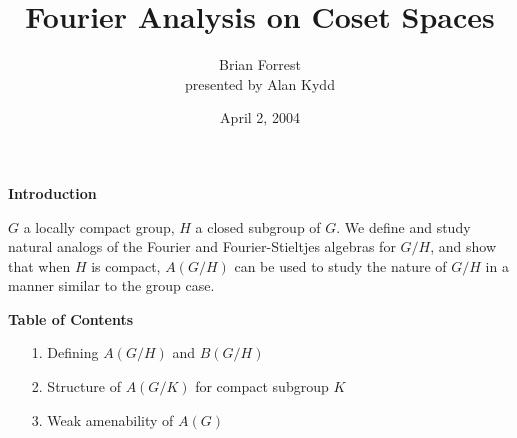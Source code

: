 \documentclass[landscape]{slides}
\title{Fourier Analysis on Coset Spaces}
\author{Brian Forrest\\presented by Alan Kydd}
\date{April 2, 2004}
\begin{document}
\maketitle

\begin{slide}
\textbf{Introduction}

$G$ a locally compact group, $H$ a closed subgroup of $G$.  We define and study
natural analogs of the Fourier and Fourier-Stieltjes algebras for $G/H$, and show
that when $H$ is compact, $A(G/H)$ can be used to study the nature of $G/H$ in a manner
similar to the group case.

\textbf{Table of Contents}
\begin{enumerate}
\item[1.] Defining $A(G/H)$ and $B(G/H)$
\item[2.] Structure of $A(G/K)$ for compact subgroup $K$
\item[3.] Weak amenability of $A(G)$
\end{enumerate}
\end{slide}

\end{document}
